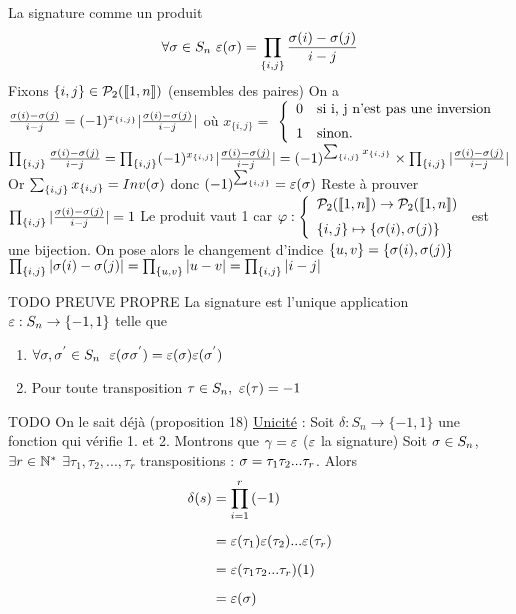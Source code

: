\documentclass[11pt]{article}
\begin{document}
\begin{prop}{La signature comme un produit}{}
    \begin{equation*}
        \forall  \sigma \in S_{n} ~ \varepsilon(\sigma) = \prod_{\{i, j\}} \frac{\sigma(i) - \sigma(j) }{i - j}
    \end{equation*}
    \tcblower
    Fixons $\{i, j \} \in \mathcal{P}_{2}(\llbracket 1, n \rrbracket)$ (ensembles des paires)\n
    On a $\frac{\sigma(i) - \sigma(j) }{i - j} = (-1)^{x_{\{i, j \}}} |\frac{\sigma(i) - \sigma(j) }{i - j}|$\n
    où $x_{\{i, j \}} = $ 
    $\left\{ \begin{array}{ll}
        0 & \mbox{si {i, j} n'est pas une inversion} \n
        1 & \mbox{sinon.}
    \end{array} \right.$\n
    $\prod_{\{i, j\}} \frac{\sigma(i) - \sigma(j) }{i - j} = \prod_{\{i, j\}} (-1)^{x_{\{i, j \}}} |\frac{\sigma(i) - \sigma(j) }{i - j}| = (-1)^{\sum_{\{i, j \}} x_{\{i, j \}}} \times \prod_{\{i, j\}} |\frac{\sigma(i) - \sigma(j) }{i - j}|$\n\n
    Or $\sum_{\{i, j \}} x_{\{i, j \}} = Inv(\sigma)$ donc $(-1)^{\sum_{\{i, j \}}} = \varepsilon(\sigma)$\n\n
    Reste à prouver $\prod_{\{i, j\}} |\frac{\sigma(i) - \sigma(j) }{i - j}| = 1$\n\n
    Le produit vaut 1 car\n
    $\phi : \left\{ \begin{array}{ll}
        \mathcal{P}_{2}(\lb 1, n \rb) \to \mathcal{P}_{2}(\lb 1, n \rb) \n
        \{ i, j \} \mapsto \{ \s(i), \s(j) \}
    \end{array} \right.$ est une bijection. \n
    On pose alors le changement d'indice $\{ u, v \} = \{ \sigma(i), \sigma(j) \}$\n\n
    $\prod_{\{i, j\}} |\sigma(i) - \sigma(j)| = \prod_{\{u, v\}} |u - v| = \prod_{\{i, j\}} |i - j|$
\end{prop}

\begin{thm}{TODO PREUVE PROPRE}{}
    La signature est l'unique application $\varepsilon : S_{n} \to \{ -1, 1 \}$ telle que
    \begin{enumerate}
        \item $\forall \sigma, \sigma^{'} \in S_{n} ~~ \varepsilon(\sigma \sigma^{'}) = \varepsilon(\sigma) \varepsilon(\sigma^{'})$
        \item Pour toute transposition $\tau \in S_{n}, ~ \varepsilon(\tau) = -1$
    \end{enumerate}
    \tcblower
     TODO\n
     On le sait déjà (proposition 18)\n
    \underline{Unicité} : Soit $\delta : S_{n} \to \{ -1, 1 \}$ une fonction qui vérifie 1. et 2.\n
    Montrons que $\gamma = \varepsilon$ ($\varepsilon$ la signature)\n
    Soit $\sigma \in S_{n}$, $\exists r \in \mathbb{N}^{*}$ $\exists \tau_{1}, \tau_{2}, ..., \tau_{r}$ transpositions : $\sigma = \tau_{1} \tau_{2} ... \tau_{r}$.\n
    Alors \begin{align*}
        \delta(s) &= \prod_{i=1}^{r}{(-1)} \n
    &= \e(\tau_{1})  \e(\tau_{2}) ... \e(\tau_{r})\n
    &= \e(\tau_{1} \tau_{2} ... \tau_{r}) (1)\n
    &= \e(\s)
    \end{align*}
\end{thm}
\end{document}
